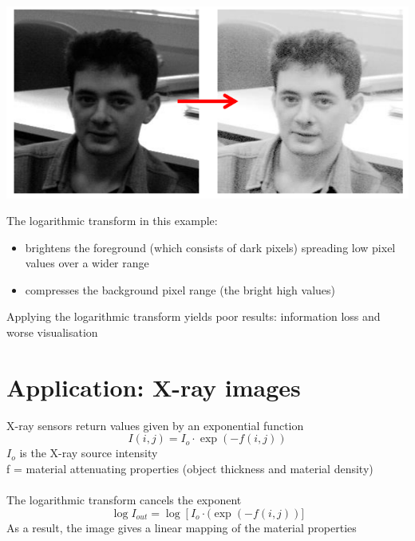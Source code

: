\documentclass{article}[18pt]
\begin{document}
\begin{center}
	\includegraphics[scale=0.7]{log1}
\end{center}
The logarithmic transform in this example:
\begin{itemize}
	\item brightens the foreground (which consists of dark pixels) spreading low pixel values over a wider range
	\item compresses the background pixel range (the bright high values)
\end{itemize}
Applying the logarithmic transform yields poor results: information loss and worse visualisation
\section{Application: X-ray images}
X-ray sensors return values given by an exponential function
\[
I(i, j)=I_{o} \cdot \exp (-f(i, j))
\]
$I_o$ is the X-ray source intensity\\
f = material attenuating properties (object thickness and material density)\\
\\
The logarithmic transform cancels the exponent
\[
\log I_{o u t}=\log \left[I_{o} \cdot(\exp (-f(i, j))]\right.
\]
As a result, the image gives a linear mapping of the material properties
\end{document}
